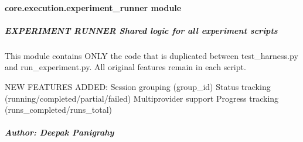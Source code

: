 \documentclass[letterpaper,10pt,english]{sphinxmanual}
\begin{document}
\sphinxstepscope


\paragraph{core.execution.experiment\_runner module}
\label{\detokenize{core.execution.experiment_runner:module-core.execution.experiment_runner}}\label{\detokenize{core.execution.experiment_runner:core-execution-experiment-runner-module}}\label{\detokenize{core.execution.experiment_runner::doc}}

\subparagraph{EXPERIMENT RUNNER \textendash{} Shared logic for all experiment scripts}
\label{\detokenize{core.execution.experiment_runner:experiment-runner-shared-logic-for-all-experiment-scripts}}
\sphinxAtStartPar
This module contains ONLY the code that is duplicated between test\_harness.py
and run\_experiment.py. All original features remain in each script.

\sphinxAtStartPar
NEW FEATURES ADDED:
\sphinxhyphen{} Session grouping (group\_id)
\sphinxhyphen{} Status tracking (running/completed/partial/failed)
\sphinxhyphen{} Multi\sphinxhyphen{}provider support
\sphinxhyphen{} Progress tracking (runs\_completed/runs\_total)


\subparagraph{Author: Deepak Panigrahy}
\label{\detokenize{core.execution.experiment_runner:author-deepak-panigrahy}}
\end{document}
